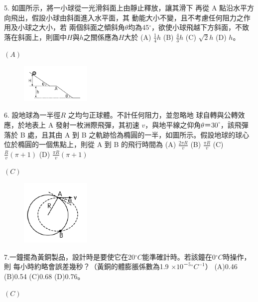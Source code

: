 \documentclass[cn,10pt,math=newtx]{elegantbook}
\begin{document}
\begin{example}
   5. 如圖所示，將一小球從一光滑斜面上由靜止釋放，讓其滑下
再從 A 點沿水平方向飛出，假設小球由斜面進入水平面，其
動能大小不變，且不考慮任何阻力之作用及小球之大小，若
兩個斜面之傾斜角$\theta$均為45$^\circ$，欲使小球飛越下方斜面，不致
落在斜面上，則圖中$H$與$h$之關係應為$H$大於 
(A) $\frac{1}{4} h$          (B) $\frac{4}{3} h$         (C) $\sqrt{2}h$        (D) $h$。\\
    \rightline{[全國聯招教甄109]}
\end{example}
\begin{solution}
    $(A)$
\end{solution}
\begin{figure}[htbp]
    \flushright
    \includegraphics[width=0.3\textwidth]{image/109全國5.png}
  \end{figure}
\newpage

\begin{example}
   6. 設地球為一半徑$R$ 之均勻正球體。不計任何阻力，並忽略地
球自轉與公轉效應，於地表上 A 發射一枚洲際飛彈，其初速
$v$，與地平線之仰角$\theta＝30 ^\circ$，該飛彈落於 B 處，且其由 A 到
B 之軌跡恰為橢圓的一半，如圖所示。假設地球的球心位於橢圓的一個焦點上，則從 A 到 B 的飛行時間為
(A) $\frac{2\pi R}{v}$  (B) $\frac{\pi R}{v}$  (C) $\frac{ R}{v}(\pi+1)$  (D) $\frac{\pi  R}{v}(\pi+1)$
\\
    \rightline{[全國聯招教甄109]}
\end{example}
\begin{solution}
    $(C)$
\end{solution}
\begin{figure}[htbp]
    \flushright
    \includegraphics[width=0.3\textwidth]{image/109全國6.png}
  \end{figure}
\newpage


\begin{example}
7.一鐘擺為黃銅製品，設計時是要使它在20$^\circ C$能準確計時。若該鐘在0$^\circ C$時操作，則
每小時約略會誤差幾秒？（黃銅的體膨脹係數為1.9 $\times 10^{－5}  {^\circ}C^{-1}$） (A)0.46  
(B)0.54  (C)0.68  (D)0.76。\\
  
    \rightline{[全國聯招教甄109]}
\end{example}
\begin{solution}
    $(C)$
\end{solution}
\end{document}

